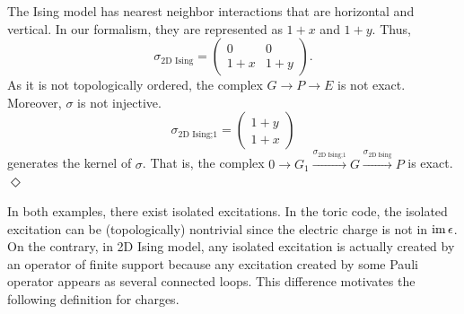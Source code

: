 \begin{example}
The Ising model has nearest neighbor interactions that are horizontal and vertical.
In our formalism, they are represented as $1+x$ and $1+y$. Thus,
\[
 \sigma_\text{2D Ising} =
\begin{pmatrix}
 0   & 0 \\
 1+x & 1+y
\end{pmatrix} .
\]
As it is not topologically ordered, the complex $G \to P \to E$ is not exact.
Moreover, $\sigma$ is not injective.
\[
 \sigma_\text{2D Ising;1} =
\begin{pmatrix}
 1+y \\
 1+x
\end{pmatrix}
\]
generates the kernel of $\sigma$. That is, the complex 
$0 \to G_1 \xrightarrow{ \sigma_\text{2D Ising;1}} G \xrightarrow{ \sigma_\text{2D Ising} } P$ is exact.
\hfill $\Diamond$
\end{example}

In both examples, there exist isolated excitations.
In the toric code, the isolated excitation can be
(topologically) nontrivial since the electric charge is not in $\mathop{\mathrm{im}}\nolimits \epsilon$.
On the contrary, in 2D Ising model, any isolated excitation is 
actually created by an operator of finite support
because any excitation created by some Pauli operator appears as several connected loops.
This difference motivates the following definition for charges.

